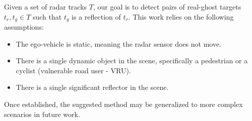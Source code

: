 \documentclass[../main.tex]{subfiles}
\begin{document}
Given a set of radar tracks $T$, our goal is to detect pairs of real-ghost targets $t_r, t_g \in T$ such that $t_g$ is a reflection of $t_r$. This work relies on the following assumptions:
\begin{itemize}
    \item The ego-vehicle is static, meaning the radar sensor does not move.
    \item There is a single dynamic object in the scene, specifically a pedestrian or a cyclist (vulnerable road user - VRU).
    \item There is a single significant reflector in the scene.
\end{itemize}
Once established, the suggested method may be generalized to more complex scenarios in future work. 
\par
\end{document}
